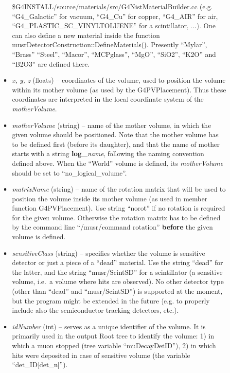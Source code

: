 \documentclass[twoside]{dis04}
\begin{document}
\begin{description}
\begin{itemize}
	             \$G4INSTALL/source/materials/src/G4NistMaterialBuilder.cc (e.g. ``G4\_Galactic'' for
	             vacuum, ``G4\_Cu'' for copper, ``G4\_AIR'' for air, 
                     ``G4\_PLASTIC\_SC\_VINYLTOLUENE'' for a scintillator, ...).
	             One can also define a new material inside the function 
                     musrDetectorConstruction::DefineMaterials().  Presently ``Mylar'', ``Brass'' 
                     ``Steel'', ``Macor'', ``MCPglass'', ``MgO'', ``SiO2'', ``K2O'' and ``B2O3'' are defined there.
	\item \emph{x, y, z} (floats) -- coordinates of the volume, used to position the volume within
                     its mother volume (as used by the G4PVPlacement).  
		     Thus these coordinates are interpreted in the local coordinate system of the \emph{motherVolume}.
	\item \emph{motherVolume} (string) -- name of the mother volume, in which the given volume should be
	             positioned.  Note that the mother volume has to be defined first (before its
                     daughter), and that the name of mother starts with a string {\bf log\_}\emph{name},
	             following the naming convention defined above.  
	             When the ``World'' volume is defined, its \emph{motherVolume} should be set to ``no\_logical\_volume''.
	\item \emph{matrixName} (string) -- name of the rotation matrix that will be used to position
	             the volume inside its mother volume (as used in member function G4PVPlacement).  
	             Use string ``norot'' if no rotation is required for the given volume.
	             Otherwise the rotation matrix has to be defined by the command line 
	             ``/musr/command rotation'' {\bf before} the given volume is defined. 
        \item \emph{sensitiveClass} (string) -- specifies whether the volume is sensitive detector or
		     just a piece of a ``dead'' material.
	             Use the string ``dead'' for the latter,
	             and the string ``musr/ScintSD'' for a scintillator (a sensitive volume, i.e.\
                     a volume where hits are observed).  No other detector type
	             (other than ``dead'' and ``musr/ScintSD'') is supported at the moment, but
	             the program might be extended in the future (e.g. to properly include also the
	             semiconductor tracking detectors, etc.).
	\item \emph{idNumber} (int) -- serves as a unique identifier of the volume.  It is primarily
	             used in the output Root tree to identify the volume: 1) in which a muon stopped 
	             (tree variable ``muDecayDetID''), 
	             2) in which hits were deposited in case of sensitive volume 
                     (the variable ``det\_ID[det\_n]'').
	\end{itemize}	


\end{description}
\end{document}
